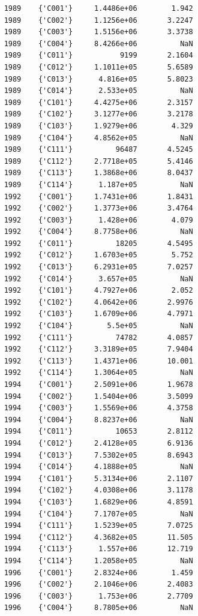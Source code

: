 \documentclass[
]{book}
\begin{document}
\begin{verbatim}
    1989    {'C001'}     1.4486e+06        1.942 
    1989    {'C002'}     1.1256e+06       3.2247 
    1989    {'C003'}     1.5156e+06       3.3738 
    1989    {'C004'}     8.4266e+06          NaN 
    1989    {'C011'}           9199       2.1604 
    1989    {'C012'}     1.1011e+05       5.6589 
    1989    {'C013'}      4.816e+05       5.8023 
    1989    {'C014'}      2.533e+05          NaN 
    1989    {'C101'}     4.4275e+06       2.3157 
    1989    {'C102'}     3.1277e+06       3.2178 
    1989    {'C103'}     1.9279e+06        4.329 
    1989    {'C104'}     4.8562e+05          NaN 
    1989    {'C111'}          96487       4.5245 
    1989    {'C112'}     2.7718e+05       5.4146 
    1989    {'C113'}     1.3868e+06       8.0437 
    1989    {'C114'}      1.187e+05          NaN 
    1992    {'C001'}     1.7431e+06       1.8431 
    1992    {'C002'}     1.3773e+06       3.4764 
    1992    {'C003'}      1.428e+06        4.079 
    1992    {'C004'}     8.7758e+06          NaN 
    1992    {'C011'}          18205       4.5495 
    1992    {'C012'}     1.6703e+05        5.752 
    1992    {'C013'}     6.2931e+05       7.0257 
    1992    {'C014'}      3.657e+05          NaN 
    1992    {'C101'}     4.7927e+06        2.052 
    1992    {'C102'}     4.0642e+06       2.9976 
    1992    {'C103'}     1.6709e+06       4.7971 
    1992    {'C104'}        5.5e+05          NaN 
    1992    {'C111'}          74782       4.0857 
    1992    {'C112'}     3.3189e+05       7.9404 
    1992    {'C113'}     1.4371e+06       10.001 
    1992    {'C114'}     1.3064e+05          NaN 
    1994    {'C001'}     2.5091e+06       1.9678 
    1994    {'C002'}     1.5404e+06       3.5099 
    1994    {'C003'}     1.5569e+06       4.3758 
    1994    {'C004'}     8.8237e+06          NaN 
    1994    {'C011'}          10653       2.8112 
    1994    {'C012'}     2.4128e+05       6.9136 
    1994    {'C013'}     7.5302e+05       8.6943 
    1994    {'C014'}     4.1888e+05          NaN 
    1994    {'C101'}     5.3134e+06       2.1107 
    1994    {'C102'}     4.0308e+06       3.1178 
    1994    {'C103'}     1.6829e+06       4.8591 
    1994    {'C104'}     7.1707e+05          NaN 
    1994    {'C111'}     1.5239e+05       7.0725 
    1994    {'C112'}     4.3682e+05       11.505 
    1994    {'C113'}      1.557e+06       12.719 
    1994    {'C114'}     1.2058e+05          NaN 
    1996    {'C001'}     2.8324e+06        1.459 
    1996    {'C002'}     2.1046e+06       2.4083 
    1996    {'C003'}      1.753e+06       2.7709 
    1996    {'C004'}     8.7805e+06          NaN 

\end{verbatim}
\end{document}
